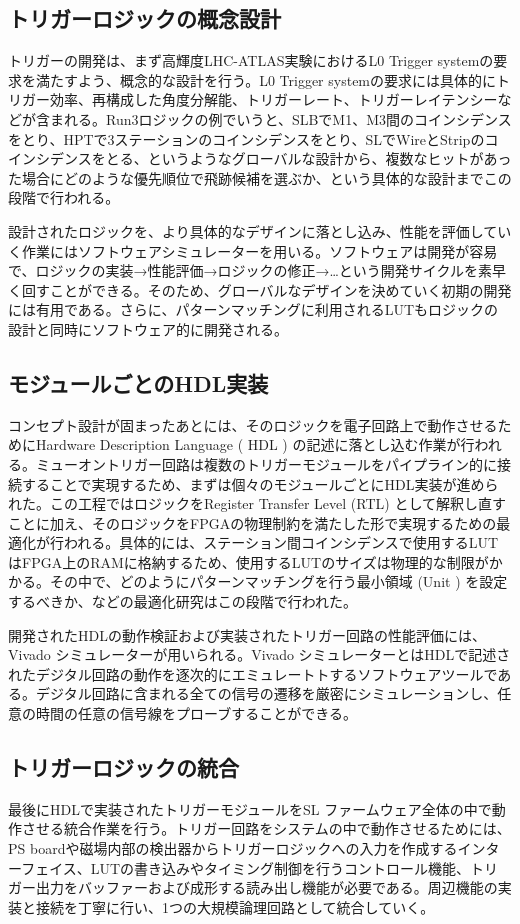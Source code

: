 \subsection*{トリガーロジックの概念設計}
トリガーの開発は、まず高輝度LHC-ATLAS実験におけるL0 Trigger systemの要求を満たすよう、概念的な設計を行う。L0 Trigger systemの要求には具体的にトリガー効率、再構成した角度分解能、トリガーレート、トリガーレイテンシーなどが含まれる。Run3ロジックの例でいうと、SLBでM1、M3間のコインシデンスをとり、HPTで3ステーションのコインシデンスをとり、SLでWireとStripのコインシデンスをとる、というようなグローバルな設計から、複数なヒットがあった場合にどのような優先順位で飛跡候補を選ぶか、という具体的な設計までこの段階で行われる。

設計されたロジックを、より具体的なデザインに落とし込み、性能を評価していく作業にはソフトウェアシミュレーターを用いる。ソフトウェアは開発が容易で、ロジックの実装→性能評価→ロジックの修正→…という開発サイクルを素早く回すことができる。そのため、グローバルなデザインを決めていく初期の開発には有用である。さらに、パターンマッチングに利用されるLUTもロジックの設計と同時にソフトウェア的に開発される。

\subsection*{モジュールごとのHDL実装}
コンセプト設計が固まったあとには、そのロジックを電子回路上で動作させるためにHardware Description Language ( HDL ) の記述に落とし込む作業が行われる。ミューオントリガー回路は複数のトリガーモジュールをパイプライン的に接続することで実現するため、まずは個々のモジュールごとにHDL実装が進められた。この工程ではロジックをRegister Transfer Level (RTL) として解釈し直すことに加え、そのロジックをFPGAの物理制約を満たした形で実現するための最適化が行われる。具体的には、ステーション間コインシデンスで使用するLUTはFPGA上のRAMに格納するため、使用するLUTのサイズは物理的な制限がかかる。その中で、どのようにパターンマッチングを行う最小領域 (Unit ) を設定するべきか、などの最適化研究はこの段階で行われた。

開発されたHDLの動作検証および実装されたトリガー回路の性能評価には、Vivado シミュレーターが用いられる。Vivado シミュレーターとはHDLで記述されたデジタル回路の動作を逐次的にエミュレートトするソフトウェアツールである。デジタル回路に含まれる全ての信号の遷移を厳密にシミュレーションし、任意の時間の任意の信号線をプローブすることができる。

\subsection*{トリガーロジックの統合}
最後にHDLで実装されたトリガーモジュールをSL ファームウェア全体の中で動作させる統合作業を行う。トリガー回路をシステムの中で動作させるためには、PS boardや磁場内部の検出器からトリガーロジックへの入力を作成するインターフェイス、LUTの書き込みやタイミング制御を行うコントロール機能、トリガー出力をバッファーおよび成形する読み出し機能が必要である。周辺機能の実装と接続を丁寧に行い、1つの大規模論理回路として統合していく。

